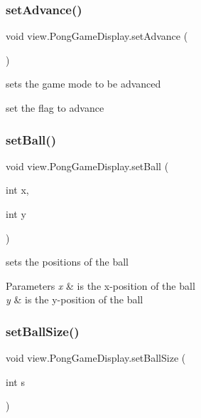 \subsubsection{\texorpdfstring{set\+Advance()}{setAdvance()}}
{\footnotesize\ttfamily void view.\+Pong\+Game\+Display.\+set\+Advance (\begin{DoxyParamCaption}{ }\end{DoxyParamCaption})}



sets the game mode to be advanced 

set the flag to advance \hypertarget{classview_1_1_pong_game_display_ac6afa3842b0a26be46dd0b7d202d887d}{}\label{classview_1_1_pong_game_display_ac6afa3842b0a26be46dd0b7d202d887d} 
\subsubsection{\texorpdfstring{set\+Ball()}{setBall()}}
{\footnotesize\ttfamily void view.\+Pong\+Game\+Display.\+set\+Ball (\begin{DoxyParamCaption}\item[{int}]{x,  }\item[{int}]{y }\end{DoxyParamCaption})}



sets the positions of the ball 


\begin{DoxyParams}{Parameters}
{\em x} & is the x-\/position of the ball \\
\hline
{\em y} & is the y-\/position of the ball \\
\hline
\end{DoxyParams}
\hypertarget{classview_1_1_pong_game_display_a295d4a14e718454eb223a5bb06141d53}{}\label{classview_1_1_pong_game_display_a295d4a14e718454eb223a5bb06141d53} 
\subsubsection{\texorpdfstring{set\+Ball\+Size()}{setBallSize()}}
{\footnotesize\ttfamily void view.\+Pong\+Game\+Display.\+set\+Ball\+Size (\begin{DoxyParamCaption}\item[{int}]{s }\end{DoxyParamCaption})}



